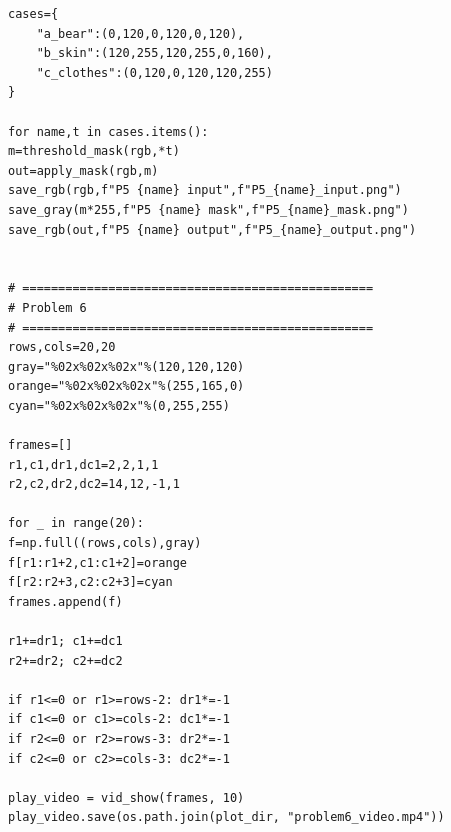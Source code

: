 \documentclass[11pt]{article}
\begin{document}
\begin{lstlisting}
cases={
	"a_bear":(0,120,0,120,0,120),
	"b_skin":(120,255,120,255,0,160),
	"c_clothes":(0,120,0,120,120,255)
}

for name,t in cases.items():
m=threshold_mask(rgb,*t)
out=apply_mask(rgb,m)
save_rgb(rgb,f"P5 {name} input",f"P5_{name}_input.png")
save_gray(m*255,f"P5 {name} mask",f"P5_{name}_mask.png")
save_rgb(out,f"P5 {name} output",f"P5_{name}_output.png")


# =================================================
# Problem 6
# =================================================
rows,cols=20,20
gray="%02x%02x%02x"%(120,120,120)
orange="%02x%02x%02x"%(255,165,0)
cyan="%02x%02x%02x"%(0,255,255)

frames=[]
r1,c1,dr1,dc1=2,2,1,1
r2,c2,dr2,dc2=14,12,-1,1

for _ in range(20):
f=np.full((rows,cols),gray)
f[r1:r1+2,c1:c1+2]=orange
f[r2:r2+3,c2:c2+3]=cyan
frames.append(f)

r1+=dr1; c1+=dc1
r2+=dr2; c2+=dc2

if r1<=0 or r1>=rows-2: dr1*=-1
if c1<=0 or c1>=cols-2: dc1*=-1
if r2<=0 or r2>=rows-3: dr2*=-1
if c2<=0 or c2>=cols-3: dc2*=-1

play_video = vid_show(frames, 10)
play_video.save(os.path.join(plot_dir, "problem6_video.mp4"))
	\end{lstlisting}
\end{document}
